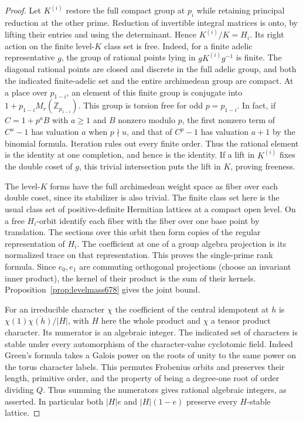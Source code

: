 \documentclass[a4paper,11pt]{article}
\theoremstyle{definition}
\theoremstyle{remark}
\newcommand{\ZZ}{\mathbb Z}\newcommand{\ord}{\operatorname{ord}}
\numberwithin{equation}{section}
\begin{document}
\begin{proof}
Let \(K^{(i)}\) restore the full compact group at \(p_i\) while
retaining principal reduction at the other prime. Reduction of
invertible integral matrices is onto, by lifting their entries
and using the determinant. Hence \(K^{(i)}/K=H_i\).
Its right action on the finite level-\(K\) class set is free.
Indeed, for a finite adelic representative \(g\), the group
of rational points lying in \(gK^{(i)}g^{-1}\) is finite.
The diagonal rational points are closed and discrete in the
full adelic group, and both the indicated finite-adelic set and
the entire archimedean group are compact. At a place over
\(p_{1-i}\), an element of this finite group is conjugate into
\(1+p_{1-i}M_r(\ZZ_{p_{1-i}})\). This group is torsion free for
odd \(p=p_{1-i}\). In fact, if \(C=1+p^aB\) with \(a\ge1\)
and \(B\) nonzero modulo \(p\), the first nonzero term of
\(C^u-1\) has valuation \(a\) when \(p\nmid u\), and that of
\(C^p-1\) has valuation \(a+1\) by the binomial formula.
Iteration rules out every finite order. Thus the rational
element is the identity at one completion, and hence is the
identity. If a lift in \(K^{(i)}\) fixes the double coset of
\(g\), this trivial intersection puts the lift in \(K\),
proving freeness.

The level-\(K\) forms have the full archimedean weight space as
fiber over each double coset, since its stabilizer is also
trivial. The finite class set here is the usual class set of
positive-definite Hermitian lattices at a compact open level.
On a free \(H_i\)-orbit identify each fiber with the fiber over
one base point by translation. The sections over this orbit
then form copies of the regular representation of \(H_i\).
The coefficient at one of a group algebra projection is its
normalized trace on that representation. This proves the
single-prime rank formula. Since \(e_0,e_1\) are commuting
orthogonal projections (choose an invariant inner product),
the kernel of their product is the sum of their kernels.
Proposition~\ref{prop:levelmass678} gives the joint bound.

For an irreducible character \(\chi\) the coefficient of the
central idempotent at \(h\) is
\(\chi(1)\overline{\chi(h)}/|H|\), with \(H\) here the whole
product and \(\chi\) a tensor product character. Its numerator
is an algebraic integer. The indicated set of characters is
stable under every automorphism of the character-value
cyclotomic field. Indeed Green's formula takes a Galois power
on the roots of unity to the same power on the torus character
labels. This permutes Frobenius orbits and preserves their
length, primitive order, and the property of being a
degree-one root of order dividing \(Q\). Thus summing the
numerators gives rational algebraic integers, as asserted.
In particular both \(|H|e\) and \(|H|(1-e)\) preserve every
\(H\)-stable lattice.


\end{proof}
\end{document}

